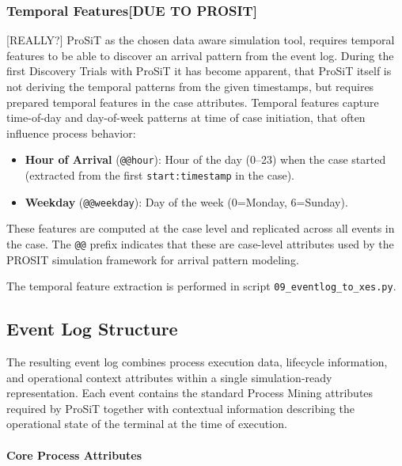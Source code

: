           \subsubsection{Temporal Features[DUE TO PROSIT]}
            
            [REALLY?] ProSiT as the chosen data aware simulation tool, requires temporal features to be able to discover an arrival pattern from the event log. During the first Discovery Trials with ProSiT it has become apparent, that ProSiT itself is not deriving the temporal patterns from the given timestamps, but requires prepared temporal features in the case attributes. Temporal features capture time-of-day and day-of-week patterns at time of case initiation, that often influence process behavior:
            
            \begin{itemize}
                \item \textbf{Hour of Arrival} (\texttt{@@hour}): Hour of the day (0--23) when the case started (extracted from the first \texttt{start:timestamp} in the case).
                \item \textbf{Weekday} (\texttt{@@weekday}): Day of the week (0=Monday, 6=Sunday).
            \end{itemize}
            
            These features are computed at the case level and replicated across all events in the case. The \texttt{@@} prefix indicates that these are case-level attributes used by the PROSIT simulation framework for arrival pattern modeling.
            
            The temporal feature extraction is performed in script \texttt{09\_eventlog\_to\_xes.py}.
    
   \subsection{Event Log Structure} 
   The resulting event log combines process execution data, lifecycle information, and operational context attributes within a single simulation-ready representation. Each event contains the standard Process Mining attributes required by ProSiT together with contextual information describing the operational state of the terminal at the time of execution.
   
   \paragraph{Core Process Attributes}
   
